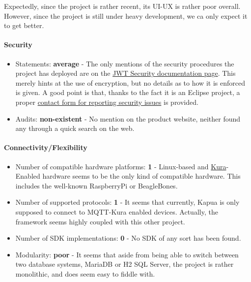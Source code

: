 \documentclass{article}
\begin{document}
Expectedly, since the project is rather recent, its UI-UX is rather poor overall. However, since the project is still under heavy development, we ca only expect it to get better.

\paragraph{Security} 

\begin{itemize}
\item Statements: \textbf{average} - The only mentions of the security procedures the project has deployed are on the \href{http://download.eclipse.org/kapua/docs/develop/user-manual/en/jwt_security.html}{JWT Security documentation page}. This merely hints at the use of encryption, but no details as to how it is enforced is given. A good point is that, thanks to the fact it is an Eclipse project, a proper \href{https://github.com/eclipse/kapua/issues}{contact form for reporting security issues} is provided.
\item Audits: \textbf{non-existent} - No mention on the product website, neither found any through a quick search on the web.
\end{itemize}

\paragraph{Connectivity/Flexibility}

\begin{itemize}
\item Number of compatible hardware platforms: \textbf{1} - Linux-based and \href{https://www.eclipse.org/kura/}{Kura}-Enabled hardware seems to be the only kind of compatible hardware. This includes the well-known RaspberryPi or BeagleBones. 
\item Number of supported protocols: \textbf{1} - It seems that currently, Kapua is only supposed to connect to MQTT-Kura enabled devices. Actually, the framework seems highly coupled with this other project.
\item Number of SDK implementations: \textbf{0} - No SDK of any sort has been found. 
\item Modularity: \textbf{poor} - It seems that aside from being able to switch between two database systems, MariaDB or H2 SQL Server, the project is rather monolithic, and does seem easy to fiddle with.
\end{itemize}
\end{document}
